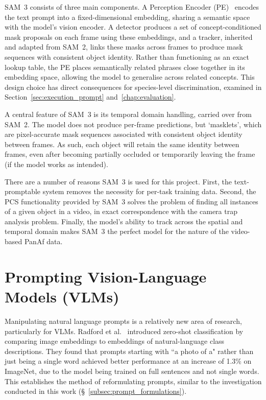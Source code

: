 \documentclass[author={Jacob Stephenson},
    degree={BSc},
    title={Robust Great Ape Species Detection in Wild Camera Trap Imagery with Promptable Concept Segmentation},
    unit={COMS30045},
    subtitle={}]{dissertation}
\begin{document}
SAM~3 consists of three main components. A Perception Encoder (PE)~\cite{bolya2025perceptionencoderbestvisual} encodes the text prompt into a fixed-dimensional embedding, sharing a semantic space with the model's vision encoder. A detector produces a set of concept-conditioned mask proposals on each frame using these embeddings, and a tracker, inherited and adapted from SAM~2, links these masks across frames to produce mask sequences with consistent object identity. Rather than functioning as an exact lookup table, the PE places semantically related phrases close together in its embedding space, allowing the model to generalise across related concepts. This design choice has direct consequences for species-level discrimination, examined in Section~\ref{sec:execution_prompt} and~\ref{chap:evaluation}.

A central feature of SAM~3 is its temporal domain handling, carried over from SAM~2. The model does not produce per-frame predictions, but `masklets', which are pixel-accurate mask sequences associated with consistent object identity between frames. As such, each object will retain the same identity between frames, even after becoming partially occluded or temporarily leaving the frame (if the model works as intended).


There are a number of reasons SAM~3 is used for this project. First, the text-promptable system removes the necessity for per-task training data. Second, the PCS functionality provided by SAM~3 solves the problem of finding all instances of a given object in a video, in exact correspondence with the camera trap analysis problem. Finally, the model's ability to track across the spatial and temporal domain makes SAM~3 the perfect model for the nature of the video-based PanAf data.


\section{Prompting Vision-Language Models (VLMs)}

Manipulating natural language prompts is a relatively new area of research, particularly for VLMs. Radford et al.~\cite{radford2021learningtransferablevisualmodels} introduced zero-shot classification by comparing image embeddings to embeddings of natural-language class descriptions. They found that prompts starting with ``a photo of a" rather than just being a single word achieved better performance at an increase of 1.3\% on ImageNet, due to the model being trained on full sentences and not single words. This establishes the method of reformulating prompts, similar to the investigation conducted in this work (\S~\ref{subsec:prompt_formulations}).
\end{document}
